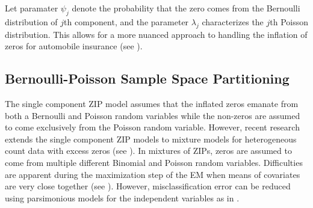 \documentclass[11pt,letterpaper]{article}
\numberwithin{equation}{section}
\numberwithin{equation}{section}
\numberwithin{equation}{section}
\begin{document}
Let paramater $\psi_j$ denote the probability that the zero comes from the Bernoulli distribution of $j$th component, and the parameter $ \lambda_j $ characterizes the $j$th Poisson distribution. This allows for a more nuanced approach to handling the inflation of zeros for automobile insurance (see \cite{Bermudez+Karlis:2012}).
\subsection{Bernoulli-Poisson Sample Space Partitioning}

The single component ZIP model assumes that the inflated zeros emanate from both a Bernoulli and Poisson random variables while the non-zeros are assumed to come exclusively from the Poisson random variable. However, recent research  extends the single component ZIP models to mixture models for heterogeneous count data with excess zeros (see  \cite{Bermudez+Karlis:2012}). In mixtures of ZIPs, zeros are assumed to come from multiple different Binomial and Poisson random variables. Difficulties are apparent  during the maximization step of the EM when means of covariates are very close together (see  \cite{LimHwa}). However, misclassification error can be reduced using parsimonious models for the independent variables as in  \cite{McNicholas:2010}.
\end{document}
